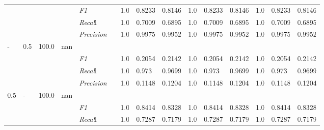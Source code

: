 \begin{table}[]
\begin{tabularx}{\textwidth}{XXlllllllllllll@{}}
& & & & \textit{F1} && 1.0        & 0.8233        & 0.8146        & 1.0        & 0.8233        & 0.8146        & 1.0        & 0.8233        & 0.8146        \\
& & & & \textit{Recal}l && 1.0    & 0.7009    & 0.6895    & 1.0    & 0.7009    & 0.6895    & 1.0    & 0.7009    & 0.6895    \\
& & & & \textit{Precision} && 1.0 & 0.9975 & 0.9952 & 1.0 & 0.9975 & 0.9952 & 1.0 & 0.9975 & 0.9952 \\ \midrule
- & 0.5 & 100.0 & nan &                                                              &                                                                   &                                                             &                                                               &                                                                    &                                                              &                                                               &                                                                    &                                                              \\
& & & & \textit{F1} && 1.0        & 0.2054        & 0.2142        & 1.0        & 0.2054        & 0.2142        & 1.0        & 0.2054        & 0.2142        \\
& & & & \textit{Recal}l && 1.0    & 0.973    & 0.9699    & 1.0    & 0.973    & 0.9699    & 1.0    & 0.973    & 0.9699    \\
& & & & \textit{Precision} && 1.0 & 0.1148 & 0.1204 & 1.0 & 0.1148 & 0.1204 & 1.0 & 0.1148 & 0.1204 \\ \midrule
0.5 & - & 100.0 & nan &                                                              &                                                                   &                                                             &                                                               &                                                                    &                                                              &                                                               &                                                                    &                                                              \\
& & & & \textit{F1} && 1.0        & 0.8414        & 0.8328        & 1.0        & 0.8414        & 0.8328        & 1.0        & 0.8414        & 0.8328        \\
& & & & \textit{Recal}l && 1.0    & 0.7287    & 0.7179    & 1.0    & 0.7287    & 0.7179    & 1.0    & 0.7287    & 0.7179    \\

\end{tabularx}
\end{table}
